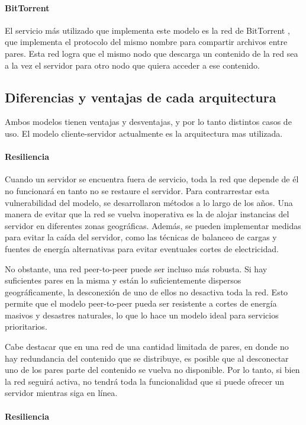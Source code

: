 \paragraph{BitTorrent} El servicio más utilizado que implementa este modelo es la red de BitTorrent \cite{bittorrent}, que implementa el protocolo del mismo nombre para compartir archivos entre pares. Esta red logra que el mismo nodo que descarga un contenido de la red sea a la vez el servidor para otro nodo que quiera acceder a ese contenido. 

\subsection{Diferencias y ventajas de cada arquitectura}
Ambos modelos tienen ventajas y desventajas, y por lo tanto distintos casos de uso. El modelo cliente-servidor actualmente es la arquitectura mas utilizada.

\paragraph{Resiliencia}
Cuando un servidor se encuentra fuera de servicio, toda la red que depende de él no funcionará en tanto no se restaure el servidor. Para contrarrestar esta vulnerabilidad del modelo, se desarrollaron métodos a lo largo de los años. Una manera de evitar que la red se vuelva inoperativa es la de alojar instancias del servidor en diferentes zonas geográficas. Además, se pueden implementar medidas para evitar la caída del servidor, como las técnicas de balanceo de cargas \cite{bourke2001server} y fuentes de energía alternativas para evitar eventuales cortes de electricidad.

No obstante, una red peer-to-peer puede ser incluso más robusta. Si hay suficientes pares en la misma y están lo suficientemente dispersos geográficamente, la desconexión de uno de ellos no desactiva toda la red. Esto permite que el modelo peer-to-peer pueda ser resistente a cortes de energía masivos y desastres naturales, lo que lo hace un modelo ideal para servicios prioritarios.

Cabe destacar que en una red de una cantidad limitada de pares, en donde no hay redundancia del contenido que se distribuye, es posible que al desconectar uno de los pares parte del contenido se vuelva no disponible. Por lo tanto, si bien la red seguirá activa, no tendrá toda la funcionalidad que si puede ofrecer un servidor mientras siga en línea.

\paragraph{Resiliencia}

